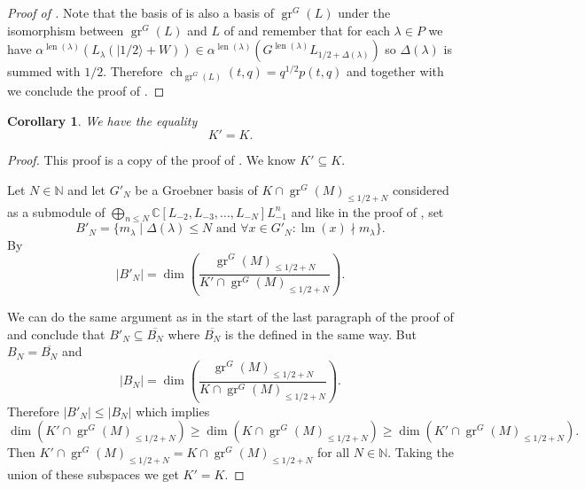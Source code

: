 \documentclass[12pt, a4paper]{article}
\newtheorem{corollary}{Corollary}
\DeclareMathOperator{\gr}{gr}
\DeclareMathOperator{\ch}{ch}
\DeclareMathOperator{\lm}{lm}
\DeclareMathOperator{\len}{len}
\newcommand{\vachalf}{|1/2\rangle}
\begin{document}
\begin{proof}[Proof of ]
  Note that the basis of  is also a basis of $\gr^G(L)$ under the isomorphism between $\gr^G(L)$ and $L$ of  and remember that for each $\lambda \in P$ we have $\alpha^{\len(\lambda)}(L_\lambda(\vachalf + W)) \in \alpha^{\len(\lambda)}(G^{\len(\lambda)}L_{1/2 + \Delta(\lambda)})$ so $\Delta(\lambda)$ is summed with $1/2$.
  Therefore $\ch_{\gr^G(L)}(t, q) = q^{1/2}p(t,q)$ and together with  we conclude the proof of .
\end{proof}

\begin{corollary}
  \label{crl:1}
  We have the equality
  \begin{equation*}
    K' = K.
  \end{equation*}
\end{corollary}

\begin{proof}
  This proof is a copy of the proof of .
  We know $K' \subseteq K$.
  
  Let $N \in \mathbb{N}$ and let $G'_N$ be a Groebner basis of $K \cap \gr^G(M)_{\le 1/2+N}$ considered as a submodule of $\bigoplus_{n \le N}\mathbb{C}[L_{-2}, L_{-3}, \dots, L_{-N}]L_{-1}^n$ and like in the proof of , set
  \begin{equation*}
    B'_N = \{m_\lambda \mid \Delta(\lambda) \le N\text{ and }\forall x \in G'_N: \lm(x) \nmid m_\lambda\}.
  \end{equation*}
  By 
  \begin{equation*}
    |B'_N| = \dim\left(\frac{\gr^G(M)_{\le 1/2 + N}}{K' \cap \gr^G(M)_{\le 1/2 + N}}\right).
  \end{equation*}

  We can do the same argument as in the start of the last paragraph of the proof of  and conclude that $B'_N \subseteq \overline{B_N}$ where $\overline{B_N}$ is the defined in the same way.
  But $B_N = \overline{B_N}$ and
  \begin{equation*}
    |B_N| = \dim\left(\frac{\gr^G(M)_{\le 1/2+N}}{K \cap \gr^G(M)_{\le 1/2+N}}\right).
  \end{equation*}
  Therefore $|B'_N| \le |B_N|$ which implies
  \begin{equation*}
    \dim(K' \cap \gr^G(M)_{\le 1/2 + N}) \ge \dim(K \cap \gr^G(M)_{\le 1/2 + N}) \ge \dim(K' \cap \gr^G(M)_{\le 1/2 + N}).
  \end{equation*}
  Then $K' \cap \gr^G(M)_{\le 1/2 + N} = K \cap \gr^G(M)_{\le 1/2 + N}$ for all $N \in \mathbb{N}$.
  Taking the union of these subspaces we get $K' = K$.
\end{proof}
\end{document}
